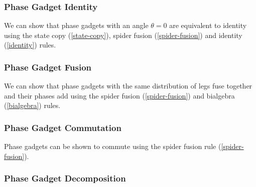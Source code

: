 

\subsubsection{Phase Gadget Identity}%

We can show that phase gadgets with an angle $\theta = 0$ are equivalent to identity using the state copy (\ref{state-copy}), spider fusion (\ref{spider-fusion}) and identity (\ref{identity}) rules.



\subsubsection{Phase Gadget Fusion}%
\label{phase-gadget-fusion}
We can show that phase gadgets with the same distribution of legs fuse together and their phases add using the spider fusion (\ref{spider-fusion}) and bialgebra (\ref{bialgebra}) rules.



\subsubsection{Phase Gadget Commutation}%
\label{phase-gadget-commutation}

Phase gadgets can be shown to commute using the spider fusion rule (\ref{spider-fusion}).



\subsubsection{Phase Gadget Decomposition}%

